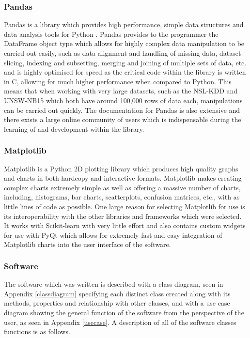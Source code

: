 \documentclass[12pt,a4paper]{article}
\begin{document}
\subsubsection{Pandas}
Pandas is a library which provides high performance, simple data structures and data analysis tools for Python \parencite{pandas}. Pandas provides to the programmer the DataFrame object type which allows for highly complex data manipulation to be carried out easily, such as data alignment and handling of missing data, dataset slicing, indexing and subsetting, merging and joining of multiple sets of data, etc. and is highly optimised for speed as the critical code within the library is written in C, allowing for much higher performance when compared to Python. This means that when working with very large datasets, such as the NSL-KDD and UNSW-NB15 which both have around 100,000 rows of data each, manipulations can be carried out quickly. The documentation for Pandas is also extensive and there exists a large online community of users which is indispensable during the learning of and development within the library.

\subsubsection{Matplotlib}
Matplotlib \parencite{matplotlib} is a Python 2D plotting library which produces high quality graphs and charts in both hardcopy and interactive formats. Matplotlib makes creating complex charts extremely simple as well as offering a massive number of charts, including, histograms, bar charts, scatterplots, confusion matrices, etc., with as little lines of code as possible. One large reason for selecting Matplotlib for use is its interoperability with the other libraries and frameworks which were selected. It works with Scikit-learn with very little effort and also contains custom widgets for use with PyQt which allows for extremely fast and easy integration of Matplotlib charts into the user interface of the software.

\subsubsection{Software}
The software which was written is described with a class diagram, seen in Appendix \ref{classdiagram} specifying each distinct class created along with its methods, properties and relationship with other classes, and with a use case diagram showing the general function of the software from the perspective of the user, as seen in Appendix \ref{usecase}. A description of all of the software classes functions is as follows.
\end{document}
